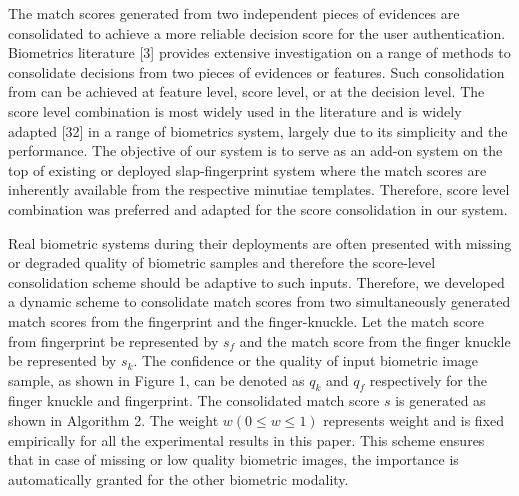 The match scores generated from two independent pieces of evidences are consolidated to achieve a more reliable decision score for the user authentication. Biometrics literature [3] provides extensive investigation on a range of methods to consolidate decisions from two pieces of evidences or features. Such consolidation from can be achieved at feature level, score level, or at the decision level. The score level combination is most widely used in the literature and is widely adapted [32] in a range of biometrics system, largely due to its simplicity and the performance. The objective of our system is to serve as an add-on system on the top of existing or deployed slap-fingerprint system where the match scores are inherently available from the respective minutiae templates. Therefore, score level combination was preferred and adapted for the score consolidation in our system.  

Real biometric systems during their deployments are often presented with missing or degraded quality of biometric samples and therefore the score-level consolidation scheme should be adaptive to such inputs. Therefore, we developed a dynamic scheme to consolidate match scores from two simultaneously generated match scores from the fingerprint and the finger-knuckle. Let the match score from fingerprint be represented by $s_f$ and the match score from the finger knuckle be represented by $s_k$. The confidence or the quality of input biometric image sample, as shown in Figure 1, can be denoted as $q_k$ and $q_f$ respectively for the finger knuckle and fingerprint. The consolidated match score $s$ is generated as shown in Algorithm 2. The weight $w ( 0 \leq w \leq 1)$  represents weight and is fixed empirically for all the experimental results in this paper. This scheme ensures that in case of missing or low quality biometric images, the importance is automatically granted for the other biometric modality.  